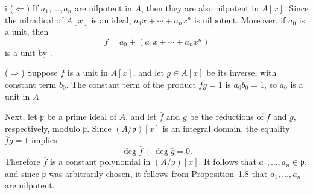 \begin{partsolution}{i}
(\(\Leftarrow\))
If \(a_1,\ldots,a_n\) are nilpotent in \(A\), then they are also nilpotent in \(A[x]\).
Since the nilradical of \(A[x]\) is an ideal, \(a_1 x + \cdots + a_n x^n\) is nilpotent.
Moreover, if \(a_0\) is a unit, then
\begin{equation*}
f = a_0 + (a_1 x + \cdots + a_n x^n)
\end{equation*}
is a unit by .

(\(\Rightarrow\))
Suppose \(f\) is a unit in \(A[x]\), and let \(g \in A[x]\) be its inverse, with constant term \(b_0\).
The constant term of the product \(f g = 1\) is \(a_0 b_0 = 1\), so \(a_0\) is a unit in \(A\).

Next, let \(\mathfrak p\) be a prime ideal of \(A\), and let \(\overline f\) and \(\overline g\) be the reductions of \(f\) and \(g\), respectively, modulo \(\mathfrak p\).
Since \((A/\mathfrak p)[x]\) is an integral domain, the equality \(\overline f \overline g = 1\) implies
\begin{equation*}
\deg \overline f + \deg \overline g = 0.
\end{equation*}
Therefore \(\overline f\) is a constant polynomial in \((A/\mathfrak p)[x]\).
It follows that \(a_1,\ldots,a_n \in \mathfrak p\), and since \(\mathfrak p\) was arbitrarily chosen, it follows from Proposition~1.8 that \(a_1,\ldots, a_n\) are nilpotent.
\end{partsolution}

